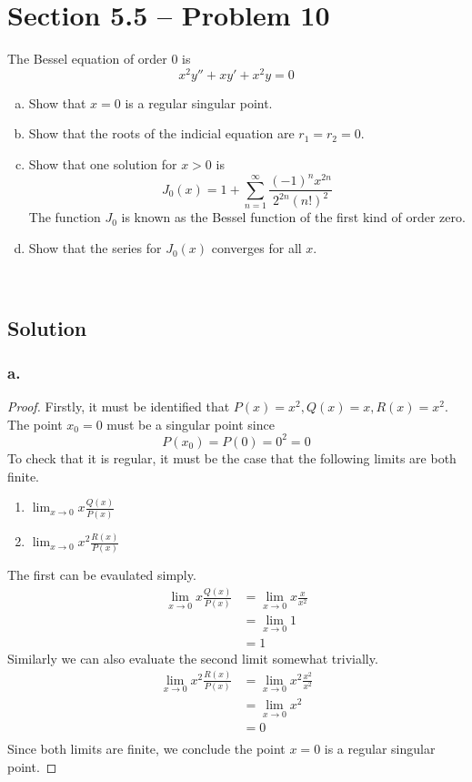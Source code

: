 \documentclass{article}
\theoremstyle{definition}
\begin{document}
\section*{Section 5.5 -- Problem 10}
    The Bessel equation of order 0 is
    \[
    x^2 y'' + x y' + x^2 y = 0
    \] 
    \begin{enumerate}[a.]
        \item Show that $x=0$ is a regular singular point.
        \item Show that the roots of the indicial equation are $r_1=r_2=0$.
        \item Show that one solution for $x>0$ is
        \[
            J_0(x) = 1 + \sum_{n=1}^\infty \frac{(-1)^n x^{2n}}{2^{2n}(n!)^2}
        \] 
    The function $J_0$ is known as the Bessel function of the first kind of order zero. 
        \item Show that the series for $J_0(x)$ converges for all $x$.
    \end{enumerate}
    \\ \hline
    \subsection*{Solution}
        \subsubsection*{a.}
            \begin{proof}
                Firstly, it must be identified that $P(x) = x^2, Q(x) = x, R(x) = x^2$.
                The point $x_0 = 0$ must be a singular point since
                \[
                    P(x_0) = P(0) = 0^2 = 0
                \]
                To check that it is regular, it must be the case that the following limits are both finite.
                \begin{enumerate}
                    \item $\lim_{x\to 0}x\frac{Q(x)}{P(x)}$\\
                    \item $\lim_{x\to 0}x^2 \frac{R(x)}{P(x)}$
                \end{enumerate}
                The first can be evaulated simply.
                \begin{align*}
                    \lim_{x\to 0} x\frac{Q(x)}{P(x)} &= \lim_{x\to 0}x \frac{x}{x^2} \\
                    &= \lim_{x\to 0} 1 \\
                    &= 1
                \end{align*}
                Similarly we can also evaluate the second limit somewhat trivially.
                \begin{align*}
                    \lim_{x\to 0} x^2 \frac{R(x)}{P(x)} &= \lim_{x\to 0}x^2 \frac{x^2}{x^2} \\
                    &= \lim_{x\to 0}x^2 \\
                    &= 0 \\
                \end{align*}
            Since both limits are finite, we conclude the point $x = 0$ is a regular singular point.
            \end{proof}
\end{document}
